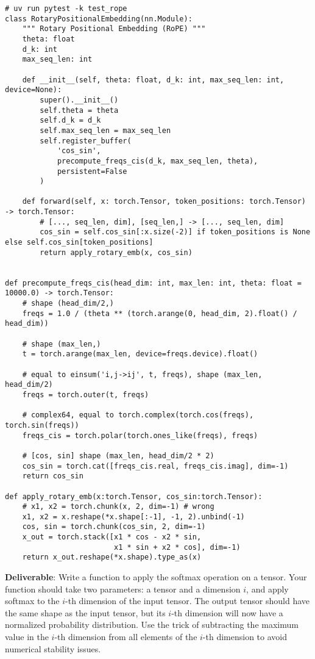 \begin{lstlisting}
# uv run pytest -k test_rope
class RotaryPositionalEmbedding(nn.Module):
    """ Rotary Positional Embedding (RoPE) """
    theta: float
    d_k: int
    max_seq_len: int
    
    def __init__(self, theta: float, d_k: int, max_seq_len: int, device=None):
        super().__init__()
        self.theta = theta
        self.d_k = d_k
        self.max_seq_len = max_seq_len
        self.register_buffer(
            'cos_sin', 
            precompute_freqs_cis(d_k, max_seq_len, theta),
            persistent=False
        )
    
    def forward(self, x: torch.Tensor, token_positions: torch.Tensor) -> torch.Tensor:
        # [..., seq_len, dim], [seq_len,] -> [..., seq_len, dim]
        cos_sin = self.cos_sin[:x.size(-2)] if token_positions is None else self.cos_sin[token_positions]
        return apply_rotary_emb(x, cos_sin)


def precompute_freqs_cis(head_dim: int, max_len: int, theta: float = 10000.0) -> torch.Tensor:
    # shape (head_dim/2,)
    freqs = 1.0 / (theta ** (torch.arange(0, head_dim, 2).float() / head_dim)) 
    
    # shape (max_len,)
    t = torch.arange(max_len, device=freqs.device).float() 
    
    # equal to einsum('i,j->ij', t, freqs), shape (max_len, head_dim/2)
    freqs = torch.outer(t, freqs) 
    
    # complex64, equal to torch.complex(torch.cos(freqs), torch.sin(freqs))
    freqs_cis = torch.polar(torch.ones_like(freqs), freqs)  
    
    # [cos, sin] shape (max_len, head_dim/2 * 2)
    cos_sin = torch.cat([freqs_cis.real, freqs_cis.imag], dim=-1) 
    return cos_sin
    
def apply_rotary_emb(x:torch.Tensor, cos_sin:torch.Tensor):
    # x1, x2 = torch.chunk(x, 2, dim=-1) # wrong
    x1, x2 = x.reshape(*x.shape[:-1], -1, 2).unbind(-1)
    cos, sin = torch.chunk(cos_sin, 2, dim=-1)
    x_out = torch.stack([x1 * cos - x2 * sin, 
                         x1 * sin + x2 * cos], dim=-1)
    return x_out.reshape(*x.shape).type_as(x)
\end{lstlisting}


\textbf{Deliverable}: Write a function to apply the softmax operation on a tensor. Your function should take two parameters: a tensor and a dimension $i$, and apply softmax to the $i$-th dimension of the input tensor. The output tensor should have the same shape as the input tensor, but its $i$-th dimension will now have a normalized probability distribution. Use the trick of subtracting the maximum value in the $i$-th dimension from all elements of the $i$-th dimension to avoid numerical stability issues.

